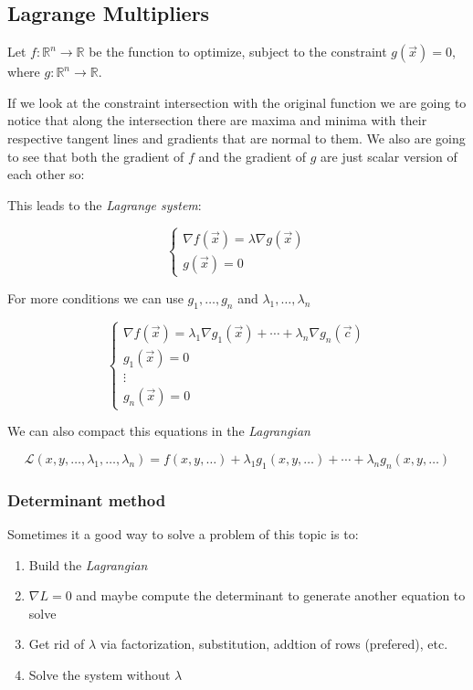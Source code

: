 \subsection{Lagrange Multipliers}

Let \( f : \mathbb{R}^n \to \mathbb{R} \) be the function to optimize, subject to the constraint \( g(\vec{x}) = 0 \), where \( g : \mathbb{R}^n \to \mathbb{R} \).  

If we look at the constraint intersection with the original function we are going to notice that along the intersection
there are maxima and minima with their respective tangent lines
and gradients that are normal to them. We also are going to see that both the gradient of \(f\) and 
the gradient of \(g\) are just scalar version of each other so: 

This leads to the \emph{Lagrange system}:

\[
\begin{cases}
\nabla f(\vec{x}) = \lambda \nabla g(\vec{x}) \\
g(\vec{x}) = 0
\end{cases}
\]

For more conditions  we can use \(g_1, \dots, g_n\) and \(\lambda_1, \dots, \lambda_n\)

\[
\begin{cases}
\nabla f(\vec{x}) = \lambda_1 \nabla g_1(\vec{x}) + \cdots + \lambda_n \nabla g_n(\vec{c}) \\
g_1(\vec{x}) = 0 \\
\vdots \\
g_n(\vec{x}) = 0
\end{cases}
\]


We can also compact this equations in the \emph{Lagrangian}

\[
\mathcal{L}(x,y, \dots, \lambda_1, \dots, \lambda_n) = f(x, y, \dots) + \lambda_1 g_1(x, y, \dots) + \cdots + \lambda_n g_n(x, y, \dots)
\]

\subsubsection{Determinant method}

Sometimes it a good way to solve a problem of this topic is to:

\begin{enumerate}
    \item Build the \emph{Lagrangian}
    \item \(\nabla L = 0\) and maybe compute the determinant to generate another equation to solve
    \item Get rid of \(\lambda\) via factorization, substitution, addtion of rows (prefered), etc.
    \item Solve the system without \(\lambda\)
\end{enumerate}

